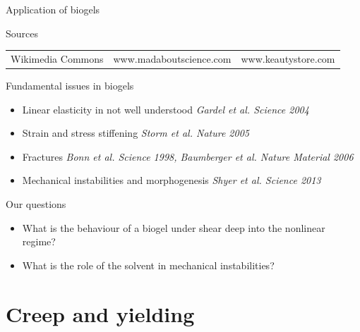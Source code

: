 \documentclass[xcolor=table]{beamer}
\begin{document}
\begin{frame}{Application of biogels}
\begin{footnotesize}
\begin{block}{Sources}
\begin{tabu}{lXl}
Wikimedia Commons & www.madaboutscience.com & www.keautystore.com\\
\end{tabu}
\end{block}
\end{footnotesize}
\end{frame}



\begin{frame}{Fundamental issues in biogels}
\begin{itemize}
\item Linear elasticity in not well understood \textit{\scriptsize Gardel et al. Science 2004}
\item Strain and stress stiffening \textit{\scriptsize Storm et al. Nature 2005}
\item Fractures \textit{\scriptsize Bonn et al. Science 1998, Baumberger et al. Nature Material 2006}
\item Mechanical instabilities and morphogenesis \textit{\scriptsize Shyer et al. Science 2013}
\end{itemize}
\begin{block}{Our questions}
\begin{itemize}
\item What is the behaviour of a biogel under shear deep into the nonlinear regime?
\item What is the role of the solvent in mechanical instabilities?
\end{itemize}
\end{block}
\end{frame}

\section{Creep and yielding}
\end{document}
